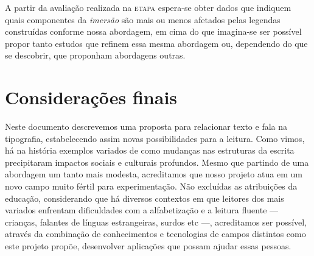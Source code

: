 \documentclass[a4paper,11pt,titlepage,singlespacing]{article}
\newcommand{\etapa}[1]{\textsc{etapa \oldstylenums{#1}}}
\begin{document}
    A partir da avaliação realizada na \etapa{4} espera-se obter dados que indiquem quais componentes da \textit{imersão} são mais ou menos afetados pelas legendas construídas conforme nossa abordagem, em cima do que imagina-se ser possível propor tanto estudos que refinem essa mesma abordagem ou, dependendo do que se descobrir, que proponham abordagens outras.
    
    


\section{Considerações finais}
\label{sec:consideracoes_finais}

Neste documento descrevemos uma proposta para relacionar texto e fala na tipografia, estabelecendo assim novas possibilidades para a leitura. Como vimos, há na história exemplos variados de como mudanças nas estruturas da escrita precipitaram impactos sociais e culturais profundos. Mesmo que partindo de uma abordagem um tanto mais modesta, acreditamos que nosso projeto atua em um novo campo muito fértil para experimentação. Não excluídas as atribuições da educação, considerando que há diversos contextos em que leitores dos mais variados enfrentam dificuldades com a alfabetização e a leitura fluente — crianças, falantes de línguas estrangeiras, surdos etc —, acreditamos ser possível,  através da combinação de conhecimentos e tecnologias de campos distintos como este projeto propõe, desenvolver aplicações que possam ajudar essas pessoas.
\end{document}
